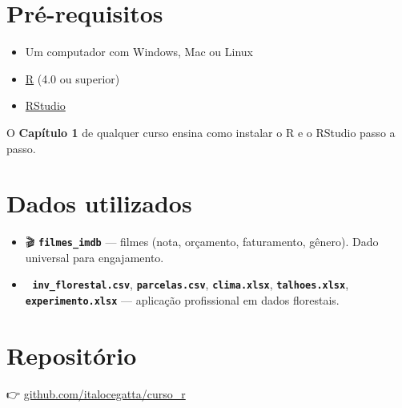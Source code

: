 \documentclass[
  letterpaper,
]{scrbook}
\providecommand{\tightlist}{%
  \setlength{\itemsep}{0pt}\setlength{\parskip}{0pt}}
\begin{document}
\section{Pré-requisitos}\label{pruxe9-requisitos}

\begin{itemize}
\tightlist
\item
  Um computador com Windows, Mac ou Linux
\item
  \href{https://cran.r-project.org/}{R} (4.0 ou superior)
\item
  \href{https://posit.co/download/rstudio-desktop/}{RStudio}
\end{itemize}

\begin{tcolorbox}[enhanced jigsaw, arc=.35mm, bottomrule=.15mm, bottomtitle=1mm, breakable, colback=white, colbacktitle=quarto-callout-tip-color!10!white, colframe=quarto-callout-tip-color-frame, coltitle=black, left=2mm, leftrule=.75mm, opacityback=0, opacitybacktitle=0.6, rightrule=.15mm, title=\textcolor{quarto-callout-tip-color}{\faLightbulb}\hspace{0.5em}{Não sabe instalar?}, titlerule=0mm, toprule=.15mm, toptitle=1mm]

O \textbf{Capítulo 1} de qualquer curso ensina como instalar o R e o
RStudio passo a passo.

\end{tcolorbox}

\section{Dados utilizados}\label{dados-utilizados}

\begin{itemize}
\tightlist
\item
  🎬 \textbf{\texttt{filmes\_imdb}} --- filmes (nota, orçamento,
  faturamento, gênero). Dado universal para engajamento.
\item
  🌲 \textbf{\texttt{inv\_florestal.csv}},
  \textbf{\texttt{parcelas.csv}}, \textbf{\texttt{clima.xlsx}},
  \textbf{\texttt{talhoes.xlsx}}, \textbf{\texttt{experimento.xlsx}} ---
  aplicação profissional em dados florestais.
\end{itemize}

\section{Repositório}\label{reposituxf3rio}

👉
\href{https://github.com/italocegatta/curso_r}{github.com/italocegatta/curso\_r}
\end{document}
